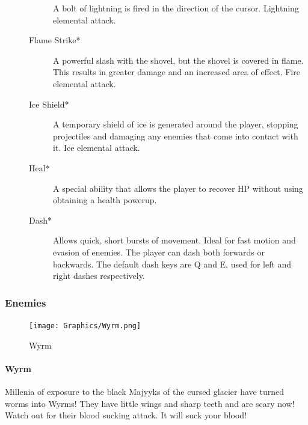 \documentclass{article}
\begin{document}
\begin{description}
\begin{description}
A bolt of lightning is fired in the direction of the cursor.  Lightning elemental attack.

\item[Flame Strike*]

A powerful slash with the shovel, but the shovel is covered in flame.  This results in greater damage and an increased area of effect.  Fire elemental attack.

\item[Ice Shield*]

A temporary shield of ice is generated around the player, stopping projectiles and damaging any enemies that come into contact with it.  Ice elemental attack.

\item[Heal*]

A special ability that allows the player to recover HP without using obtaining a health powerup.

\item[Dash*]

Allows quick, short bursts of movement.  Ideal for fast motion and evasion of enemies.  The player can dash both forwards or backwards.  The default dash keys are Q and E, used for left and right dashes respectively.

\end{description}


\end{description}

\subsubsection{Enemies}

\begin{figure}[h!]
\texttt{[image: Graphics/Wyrm.png]}
\caption{Wyrm}
\label{WyrmPic}
\end{figure}

\paragraph{Wyrm}
Millenia of exposure to the black Majyyks of the cursed glacier have turned worms into Wyrms!  They have little wings and sharp teeth and are scary now!  Watch out for their blood sucking attack.  It will suck your blood!
\end{document}

